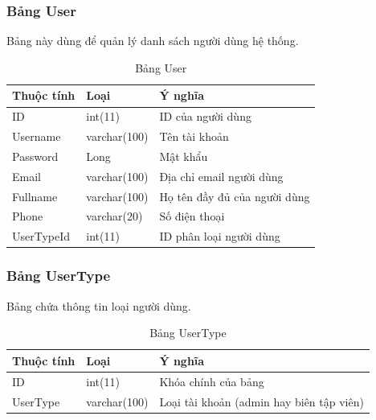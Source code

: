 		\subsubsection{Bảng User}
		Bảng này dùng để quản lý danh sách người dùng hệ thống.
			\begin{table}[H]
				\centering
				\setlength\extrarowheight{3pt}
				\begin{tabular}{|l|l|l|}
					\hline
					\textbf{Thuộc tính} & \textbf{Loại} & \textbf{Ý nghĩa} \\ \hline
					ID & int(11) & ID của người dùng\\\hline
					Username & varchar(100) &  Tên tài khoản\\\hline
					Password & Long &  Mật khẩu\\\hline
					Email & varchar(100) &  Địa chỉ email người dùng\\\hline
					Fullname & varchar(100) &  Họ tên đầy đủ của người dùng\\\hline
					Phone & varchar(20) &  Số điện thoại\\\hline
					UserTypeId & int(11) &  ID phân loại người dùng\\\hline
				\end{tabular}
				\caption{Bảng User}
				\label{tab:usertable}
			\end{table}
	
		\subsubsection{Bảng UserType}
		Bảng chứa thông tin loại người dùng.
			\begin{table}[H]
				\centering
				\setlength\extrarowheight{3pt}
				\begin{tabular}{|l|l|l|}
					\hline
					\textbf{Thuộc tính} & \textbf{Loại} & \textbf{Ý nghĩa} \\\hline
					ID      	& int(11)           &  Khóa chính của bảng\\\hline
					UserType	& varchar(100)      &  Loại tài khoản (admin hay biên tập viên)\\\hline

				\end{tabular}
				\caption{Bảng UserType}
				\label{tab:usertypetable}
			\end{table}
		
